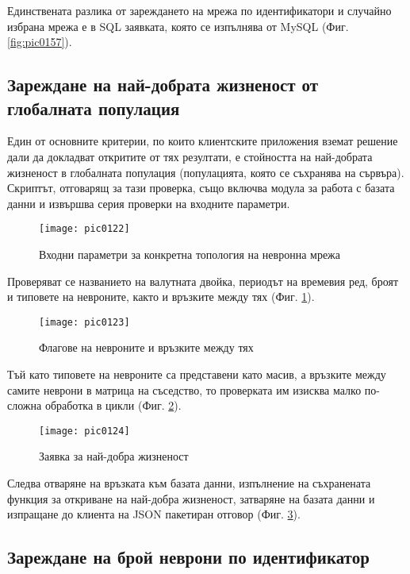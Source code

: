 Единствената разлика от зареждането на мрежа по идентификатори и случайно избрана мрежа е в SQL заявката, която се изпълнява от MySQL (Фиг. \ref{fig:pic0157}).

\subsection{Зареждане на най-добрата жизненост от глобалната популация}

Един от основните критерии, по които клиентските приложения вземат решение дали да докладват откритите от тях резултати, е стойността на най-добрата жизненост в глобалната популация (популацията, която се съхранява на сървъра). Скриптът, отговарящ за тази проверка, също включва модула за работа с базата данни и извършва серия проверки на входните параметри. 

\begin{figure}[h]
  \centering
  \texttt{[image: pic0122]}
  \caption{Входни параметри за конкретна топология на невронна мрежа}
\label{fig:pic0122}
\end{figure}
\FloatBarrier

Проверяват се названието на валутната двойка, периодът на времевия ред, броят и типовете на невроните, както и връзките между тях (Фиг. \ref{fig:pic0122}).

\begin{figure}[h]
  \centering
  \texttt{[image: pic0123]}
  \caption{Флагове на невроните и връзките между тях}
\label{fig:pic0123}
\end{figure}
\FloatBarrier

Тъй като типовете на невроните са представени като масив, а връзките между самите неврони в матрица на съседство, то проверката им изисква малко по-сложна обработка в цикли (Фиг. \ref{fig:pic0123}).

\begin{figure}[h]
  \centering
  \texttt{[image: pic0124]}
  \caption{Заявка за най-добра жизненост}
\label{fig:pic0124}
\end{figure}
\FloatBarrier

Следва отваряне на връзката към базата данни, изпълнение на съхранената функция за откриване на най-добра жизненост, затваряне на базата данни и изпращане до клиента на JSON пакетиран отговор (Фиг. \ref{fig:pic0124}).

\subsection{Зареждане на брой неврони по идентификатор}

